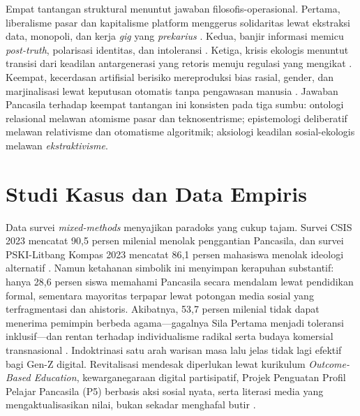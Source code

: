 \documentclass[journal]{IEEEtran}
\begin{document}
Empat tantangan struktural menuntut jawaban filosofis-operasional. Pertama, liberalisme pasar dan kapitalisme platform menggerus solidaritas lewat ekstraksi data, monopoli, dan kerja \textit{gig} yang \textit{prekarius} \cite{kurniasih2016,rahmatullah2022}. Kedua, banjir informasi memicu \textit{post-truth}, polarisasi identitas, dan intoleransi \cite{effend2024,kamalashif2023}. Ketiga, krisis ekologis menuntut transisi dari keadilan antargenerasi yang retoris menuju regulasi yang mengikat \cite{yusa2022}. Keempat, kecerdasan artifisial berisiko mereproduksi bias rasial, gender, dan marjinalisasi lewat keputusan otomatis tanpa pengawasan manusia \cite{kominfo2023,uupdp2022}. Jawaban Pancasila terhadap keempat tantangan ini konsisten pada tiga sumbu: ontologi relasional melawan atomisme pasar dan teknosentrisme; epistemologi deliberatif melawan relativisme dan otomatisme algoritmik; aksiologi keadilan sosial-ekologis melawan \textit{ekstraktivisme}.

\section{Studi Kasus dan Data Empiris}

Data survei \textit{mixed-methods} menyajikan paradoks yang cukup tajam. Survei CSIS 2023 mencatat 90,5 persen milenial menolak penggantian Pancasila, dan survei PSKI-Litbang Kompas 2023 mencatat 86,1 persen mahasiswa menolak ideologi alternatif \cite{csis2023,kompas2023}. Namun ketahanan simbolik ini menyimpan kerapuhan substantif: hanya 28,6 persen siswa memahami Pancasila secara mendalam lewat pendidikan formal, sementara mayoritas terpapar lewat potongan media sosial yang terfragmentasi dan ahistoris. Akibatnya, 53,7 persen milenial tidak dapat menerima pemimpin berbeda agama---gagalnya Sila Pertama menjadi toleransi inklusif---dan rentan terhadap individualisme radikal serta budaya komersial transnasional \cite{csis2023,kurniasih2016,effend2024}. Indoktrinasi satu arah warisan masa lalu jelas tidak lagi efektif bagi Gen-Z digital. Revitalisasi mendesak diperlukan lewat kurikulum \textit{Outcome-Based Education}, kewarganegaraan digital partisipatif, Projek Penguatan Profil Pelajar Pancasila (P5) berbasis aksi sosial nyata, serta literasi media yang mengaktualisasikan nilai, bukan sekadar menghafal butir \cite{effend2024,kompas2023,bpip2022}.
\end{document}
